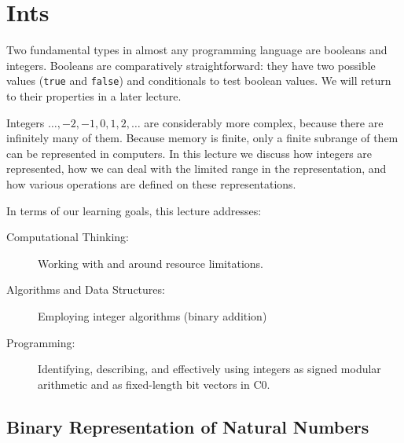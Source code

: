 \chapter{Ints}
\label{ch:ints}

\newcommand{\lecnum}{2}
\newcommand{\lecturer}{Frank Pfenning}

\maketitle

\begin{preamble}
\noindent
Two fundamental types in almost any programming language are booleans
and integers.  Booleans are comparatively straightforward: they have
two possible values (\lstinline'true' and \lstinline'false') and
conditionals to test boolean values.  We will return to their
properties in a later lecture.

Integers $\ldots, -2, -1, 0, 1, 2, \ldots$ are considerably more
complex, because there are infinitely many of them.  Because memory is
finite, only a finite subrange of them can be represented in
computers.  In this lecture we discuss how integers are represented,
how we can deal with the limited range in the representation, and
how various operations are defined on these representations.
\end{preamble}

\begin{gram}
In terms of our learning goals, this lecture addresses:

\begin{description}
\item[Computational Thinking:]
  Working with and around resource limitations.
\item[Algorithms and Data Structures:] Employing integer algorithms
  (binary addition)
\item[Programming:] Identifying, describing, and effectively using
  integers as signed modular arithmetic and as fixed-length bit
  vectors in C0.
\end{description}
\end{gram}

\section{Binary Representation of Natural Numbers}
\label{sec:ints:bin}


